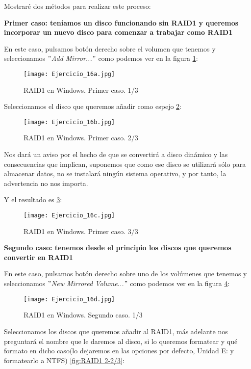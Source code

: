 \documentclass[paper=a4, fontsize=11pt]{scrartcl} %
\numberwithin{equation}{section} %
\numberwithin{figure}{section} %
\numberwithin{table}{section} %
\begin{document}
\begin{enumerate}
		Mostraré dos métodos para realizar este proceso: 
		
		\textbf{Primer caso: teníamos un disco funcionando sin RAID1 y queremos incorporar un nuevo
		disco para comenzar a trabajar como RAID1}
		
		En este caso, pulsamos botón derecho sobre el volumen que tenemos y seleccionamos
		\textit{$"$Add Mirror...$"$} como podemos ver en la figura \ref{fig:RAID1 1-1/3}:
		
		\begin{figure}[ht!]
			\centering
			\texttt{[image: Ejercicio\_16a.jpg]}
			\caption{RAID1 en Windows. Primer caso. 1/3} 	
			\label{fig:RAID1 1-1/3}
		\end{figure}

		Seleccionamos el disco que queremos añadir como espejo \ref{fig:RAID1 1-2/3}:
		
		\begin{figure}[ht!]
			\centering
			\texttt{[image: Ejercicio\_16b.jpg]}
			\caption{RAID1 en Windows. Primer caso. 2/3} 	
			\label{fig:RAID1 1-2/3}
		\end{figure}
		
		Nos dará un aviso por el hecho de que se convertirá a disco dinámico y las consecuencias que
		implican, suponemos que como ese disco se utilizará sólo para almacenar datos, no se instalará
		ningún sistema operativo, y por tanto, la advertencia no nos importa.
		
		Y el resultado es \ref{fig:RAID1 1-3/3}:
		
		\begin{figure}[ht!]
			\centering
			\texttt{[image: Ejercicio\_16c.jpg]}
			\caption{RAID1 en Windows. Primer caso. 3/3} 	
			\label{fig:RAID1 1-3/3}
		\end{figure}

		\textbf{Segundo caso: tenemos desde el principio los discos que queremos convertir en RAID1}
		
		En este caso, pulsamos botón derecho sobre uno de los volúmenes que tenemos y seleccionamos
		\textit{$"$New Mirrored Volume...$"$} como podemos ver en la figura \ref{fig:RAID1 2-1/3}:
		
		\begin{figure}[ht!]
			\centering
			\texttt{[image: Ejercicio\_16d.jpg]}
			\caption{RAID1 en Windows. Segundo caso. 1/3} 	
			\label{fig:RAID1 2-1/3}
		\end{figure}
		
		Seleccionamos los discos que queremos añadir al RAID1, más adelante nos preguntará el nombre
		que le daremos al disco, si lo queremos formatear y qué formato en dicho caso(lo dejaremos
		en las opciones por defecto, Unidad E: y formatearlo a NTFS) \ref{fig:RAID1 2-2/3}:
		

\end{enumerate}
\end{document}
